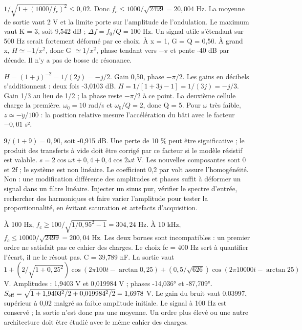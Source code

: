 $1/\sqrt{1+(1000/f_c)^2}\leq0{,}02$. Donc $f_c\leq1000/\sqrt{2499}=20{,}004$ Hz. La moyenne de sortie vaut 2 V et la limite porte sur l’amplitude de l’ondulation.
Le maximum vaut K = 3, soit 9,542 dB ; $\Delta f=f_0/Q=100$ Hz. Un signal utile s’étendant sur 500 Hz serait fortement déformé par ce choix.
À x = 1, G = Q = 0,50. À grand x, $H\simeq-1/x^2$, donc G $\simeq1/x^2$, phase tendant vers $-\pi$ et pente -40 dB par décade. Il n’y a pas de bosse de résonance.


$H=(1+j)^{-2}=1/(2j)=-j/2$. Gain 0,50, phase $-\pi/2$. Les gains en décibels s’additionnent : deux fois -3,0103 dB.
$H=1/[1+3j-1]=1/(3j)=-j/3$. Gain 1/3 au lieu de 1/2 ; la phase reste $-\pi/2$ à ce point. La deuxième cellule charge la première.
$\omega_0=10$ rad/s et $\omega_0/Q=2$, donc Q = 5. Pour \ensuremath{\omega} très faible, $z\simeq-\ddot y/100$ : la position relative mesure l’accélération du bâti avec le facteur $-0{,}01$ s².


$9/(1+9)=0{,}90$, soit -0,915 dB. Une perte de 10 \% peut être significative ; le produit des transferts à vide doit être corrigé par ce facteur si le modèle résistif est valable.
$s=2\cos\omega t+0{,}4+0{,}4\cos2\omega t$ V. Les nouvelles composantes sont 0 et 2f ; le système est non linéaire. Le coefficient 0,2 par volt assure l’homogénéité.
Non : une modification différente des amplitudes et phases suffit à déformer un signal dans un filtre linéaire. Injecter un sinus pur, vérifier le spectre d’entrée, rechercher des harmoniques et faire varier l’amplitude pour tester la proportionnalité, en évitant saturation et artefacts d’acquisition.


À 100 Hz, $f_c\geq100/\sqrt{1/0{,}95^2-1}=304{,}24$ Hz. À 10 kHz, $f_c\leq10000/\sqrt{2499}=200{,}04$ Hz. Les deux bornes sont incompatibles : un premier ordre ne satisfait pas ce cahier des charges. Le choix fc = 400 Hz sert à quantifier l’écart, il ne le résout pas. C = 39,789 nF. La sortie vaut $1+(2/\sqrt{1+0{,}25^2})\cos(2\pi100t-\arctan0{,}25)+(0{,}5/\sqrt{626})\cos(2\pi10000t-\arctan25)$ V. Amplitudes : 1,9403 V et 0,019984 V ; phases -14,036° et -87,709°. $S_{\rm eff}=\sqrt{1+1{,}9403^2/2+0{,}019984^2/2}=1{,}6978$ V. Le gain du bruit vaut 0,03997, supérieur à 0,02 malgré sa faible amplitude initiale. Le signal à 100 Hz est conservé ; la sortie n’est donc pas une moyenne. Un ordre plus élevé ou une autre architecture doit être étudié avec le même cahier des charges.

